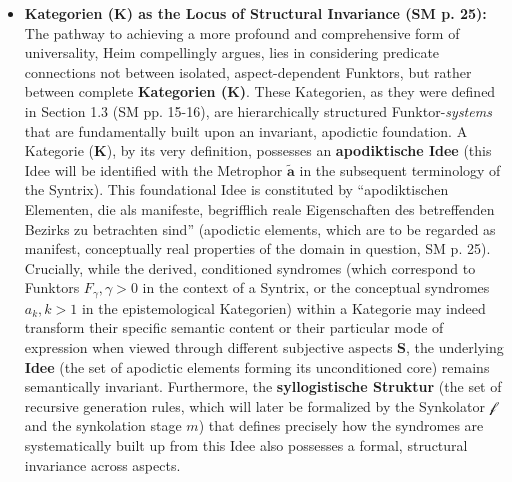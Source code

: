 \documentclass[12pt]{article}
\newcommand{\q}[1]{\enquote{#1}}
\newcommand{\kategorie}{\bm{K}}
\newcommand{\metrophor}{\bm{\widetilde{a}}}
\newcommand{\synkolator}{\mathcal{f}}
\newcommand{\synkolationsstufe}{m}
\newcommand{\syndrom}{F} %
\newcommand{\conceptualsyndrome}{a} %
\begin{document}
\begin{itemize}
    \item \textbf{Kategorien (\(\kategorie\)) as the Locus of Structural Invariance (SM p. 25):}
    The pathway to achieving a more profound and comprehensive form of universality, Heim compellingly argues, lies in considering predicate connections not between isolated, aspect-dependent Funktors, but rather between complete \textbf{Kategorien (\(\kategorie\))}. These Kategorien, as they were defined in Section 1.3 (SM pp. 15-16), are hierarchically structured Funktor-\textit{systems} that are fundamentally built upon an invariant, apodictic foundation. A Kategorie (\(\kategorie\)), by its very definition, possesses an \textbf{apodiktische Idee} (this Idee will be identified with the Metrophor \( \metrophor \) in the subsequent terminology of the Syntrix). This foundational Idee is constituted by \q{apodiktischen Elementen, die als manifeste, begrifflich reale Eigenschaften des betreffenden Bezirks zu betrachten sind} (apodictic elements, which are to be regarded as manifest, conceptually real properties of the domain in question, SM p. 25).
    Crucially, while the derived, conditioned syndromes (which correspond to Funktors \( \syndrom_\gamma, \gamma > 0 \) in the context of a Syntrix, or the conceptual syndromes \( \conceptualsyndrome_k, k>1 \) in the epistemological Kategorien) within a Kategorie may indeed transform their specific semantic content or their particular mode of expression when viewed through different subjective aspects \( \mathbf{S} \), the underlying \textbf{Idee} (the set of apodictic elements forming its unconditioned core) remains semantically invariant. Furthermore, the \textbf{syllogistische Struktur} (the set of recursive generation rules, which will later be formalized by the Synkolator \( \synkolator \) and the synkolation stage \( \synkolationsstufe \)) that defines precisely how the syndromes are systematically built up from this Idee also possesses a formal, structural invariance across aspects.


\end{itemize}
\end{document}
